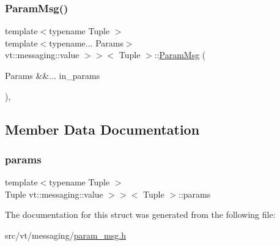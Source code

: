 \subsubsection{\texorpdfstring{Param\+Msg()}{ParamMsg()}\hspace{0.1cm}{\footnotesize\ttfamily [2/2]}}
{\footnotesize\ttfamily template$<$typename Tuple $>$ \\
template$<$typename... Params$>$ \\
vt\+::messaging\+::value $>$$>$$<$ Tuple $>$\+::\hyperlink{structvt_1_1messaging_1_1_param_msg}{Param\+Msg} (\begin{DoxyParamCaption}\item[{Params \&\&...}]{in\+\_\+params }\end{DoxyParamCaption})\hspace{0.3cm}{\ttfamily [inline]}, {\ttfamily [explicit]}}



\subsection{Member Data Documentation}
\mbox{\label{structvt_1_1messaging_1_1_param_msg_3_01_tuple_00_01std_1_1enable__if__t_3_01is__byte__copyable_50e4a53750896883a846627550850f59_a5efc1e24cae88391ea8e1283c8f3ddaf}} 
\subsubsection{\texorpdfstring{params}{params}}
{\footnotesize\ttfamily template$<$typename Tuple $>$ \\
Tuple vt\+::messaging\+::value $>$$>$$<$ Tuple $>$\+::params}



The documentation for this struct was generated from the following file\+:\begin{DoxyCompactItemize}
\item 
src/vt/messaging/\hyperlink{param__msg_8h}{param\+\_\+msg.\+h}\end{DoxyCompactItemize}
